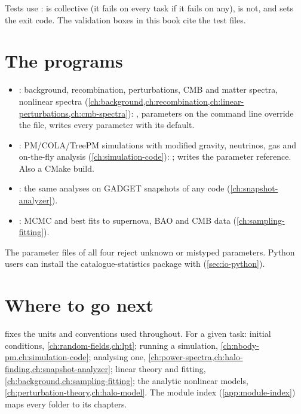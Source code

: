 Tests use :  is collective (it fails on every task if it fails on any),  is not, and
 sets the exit code. The validation boxes in this book cite the test files.

\section{The programs}\label{sec:gs-programs}

\begin{itemize}
\item {}: background, recombination, perturbations, CMB and matter spectra, nonlinear spectra
      (\cref{ch:background,ch:recombination,ch:linear-perturbations,ch:cmb-spectra}): , parameters on the
      command line override the file,  writes every parameter with its default.
\item {}: PM/COLA/TreePM simulations with modified gravity, neutrinos, gas and on-the-fly analysis
      (\cref{ch:simulation-code}): ;  writes the parameter reference.
      Also a CMake build.
\item {}: the same analyses on GADGET snapshots of any code (\cref{ch:snapshot-analyzer}).
\item {}: MCMC and best fits to supernova, BAO and CMB data (\cref{ch:sampling-fitting}).
\end{itemize}
The parameter files of all four reject unknown or mistyped parameters. Python users can install the catalogue-statistics package with
 (\cref{sec:io-python}).

\section{Where to go next}\label{sec:gs-next}

 fixes the units and conventions used throughout. For a given task: initial conditions, \cref{ch:random-fields,ch:lpt};
running a simulation, \cref{ch:nbody-pm,ch:simulation-code}; analysing one, \cref{ch:power-spectra,ch:halo-finding,ch:snapshot-analyzer}; linear
theory and fitting, \cref{ch:background,ch:sampling-fitting}; the analytic nonlinear models, \cref{ch:perturbation-theory,ch:halo-model}. The module
index (\cref{app:module-index}) maps every folder to its chapters.
